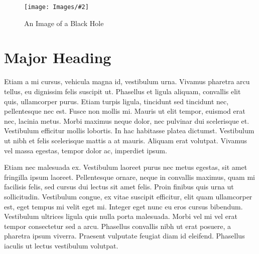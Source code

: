\documentclass[12pt]{article}
\renewcommand{\cite}{\supercite}
\newcommand{\addimage}[4][0.8]{
    \begin{figure}[h]
        \centering
        \texttt{[image: Images/\#2]}
        \caption{#3}
        \label{fig:#4}
    \end{figure}
} %
\begin{document}
\addimage[0.7]{Black Hole Image.jpg}{An Image of a Black Hole\cite{hawking_particle_1993}}{black_hole}

\section*{Major Heading}
Etiam a mi cursus, vehicula magna id, vestibulum urna. Vivamus pharetra arcu tellus, eu dignissim felis suscipit ut. Phasellus et ligula aliquam, convallis elit quis, ullamcorper purus. Etiam turpis ligula, tincidunt sed tincidunt nec, pellentesque nec est. Fusce non mollis mi. Mauris ut elit tempor, euismod erat nec, lacinia metus. Morbi maximus neque dolor, nec pulvinar dui scelerisque et. Vestibulum efficitur mollis lobortis. In hac habitasse platea dictumst. Vestibulum ut nibh et felis scelerisque mattis a at mauris. Aliquam erat volutpat. Vivamus vel massa egestas, tempor dolor ac, imperdiet ipsum\cite{rojas_engadget_2006}.

Etiam nec malesuada ex. Vestibulum laoreet purus nec metus egestas, sit amet fringilla ipsum laoreet. Pellentesque ornare, neque in convallis maximus, quam mi facilisis felis, sed cursus dui lectus sit amet felis. Proin finibus quis urna ut sollicitudin. Vestibulum congue, ex vitae suscipit efficitur, elit quam ullamcorper est, eget tempus mi velit eget mi. Integer eget nunc eu eros cursus bibendum. Vestibulum ultrices ligula quis nulla porta malesuada. Morbi vel mi vel erat tempor consectetur sed a arcu. Phasellus convallis nibh ut erat posuere, a pharetra ipsum viverra. Praesent vulputate feugiat diam id eleifend. Phasellus iaculis ut lectus vestibulum volutpat\cite{amjad_value_2020}.

\pagebreak

\printbibliography %
\end{document}
